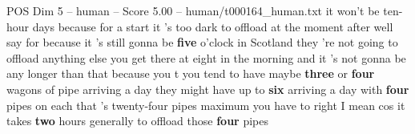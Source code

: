 \begin{textsample}{POS Dim 5 – human – Score 5.00 – human/t000164\_human.txt}  \label{ex:f5_pos_006}
it won't be ten-hour days because for a start it 's too dark to offload at the moment after well say for because it 's still gonna be \textbf{five} o'clock in Scotland they 're not going to offload anything else you get there at eight in the morning and it 's not gonna be any longer than that because you t you tend to have maybe \textbf{three} or \textbf{four} wagons of pipe arriving a day they might have up to \textbf{six} arriving a day with \textbf{four} pipes on each that 's twenty-four pipes maximum you have to right I mean cos it takes \textbf{two} hours generally to offload those \textbf{four} pipes

\end{textsample}
